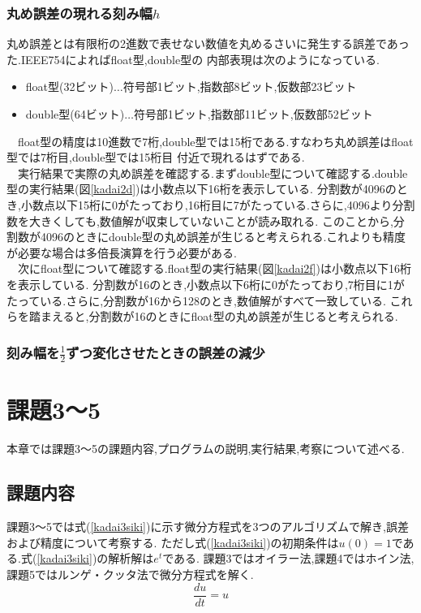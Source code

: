 \documentclass[dvipdfmx]{jarticle}
\begin{document}
    \subsubsection{丸め誤差の現れる刻み幅$h$}
    丸め誤差とは有限桁の2進数で表せない数値を丸めるさいに発生する誤差であった.IEEE754によればfloat型,double型の
    内部表現は次のようになっている.
    \begin{itemize}
      \item float型(32ビット)$\dots$符号部1ビット,指数部8ビット,仮数部23ビット
      \item double型(64ビット)$\dots$符号部1ビット,指数部11ビット,仮数部52ビット
    \end{itemize}
    　float型の精度は10進数で7桁,double型では15桁である.すなわち丸め誤差はfloat型では7桁目,double型では15桁目
    付近で現れるはずである.\\
    　実行結果で実際の丸め誤差を確認する.まずdouble型について確認する.double型の実行結果(図\ref{kadai2d})は小数点以下16桁を表示している.
    分割数が4096のとき,小数点以下15桁に0がたっており,16桁目に7がたっている.さらに,4096より分割数を大きくしても,数値解が収束していないことが読み取れる.
    このことから,分割数が4096のときにdouble型の丸め誤差が生じると考えられる.これよりも精度が必要な場合は多倍長演算を行う必要がある.\\
    　次にfloat型について確認する.float型の実行結果(図\ref{kadai2f})は小数点以下16桁を表示している.
    分割数が16のとき,小数点以下6桁に0がたっており,7桁目に1がたっている.さらに,分割数が16から128のとき,数値解がすべて一致している.
    これらを踏まえると,分割数が16のときにfloat型の丸め誤差が生じると考えられる.

    \subsubsection{刻み幅を$\frac{1}{2}$ずつ変化させたときの誤差の減少}

    \section{課題3～5}
    本章では課題3～5の課題内容,プログラムの説明,実行結果,考察について述べる.
    \subsection{課題内容}
    課題3～5では式(\ref{kadai3siki})に示す微分方程式を3つのアルゴリズムで解き,誤差および精度について考察する.
    ただし式(\ref{kadai3siki})の初期条件は$u(0)=1$である.式(\ref{kadai3siki})の解析解は$e^t$である.
    課題3ではオイラー法,課題4ではホイン法,課題5ではルンゲ・クッタ法で微分方程式を解く.
      \begin{equation}
      \frac{du}{dt} = u
          \label{kadai3siki}
        \end{equation}
\end{document}
